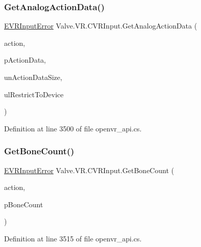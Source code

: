 \mbox{\label{class_valve_1_1_v_r_1_1_c_v_r_input_a67e83bd0fced9bfd2d9a75743d65e64f}} 
\subsubsection{\texorpdfstring{GetAnalogActionData()}{GetAnalogActionData()}}
{\footnotesize\ttfamily \mbox{\hyperlink{namespace_valve_1_1_v_r_a592d7f4189b8346d6c96dbdbaa35bc1b}{E\+V\+R\+Input\+Error}} Valve.\+V\+R.\+C\+V\+R\+Input.\+Get\+Analog\+Action\+Data (\begin{DoxyParamCaption}\item[{ulong}]{action,  }\item[{ref \mbox{\hyperlink{struct_valve_1_1_v_r_1_1_input_analog_action_data__t}{Input\+Analog\+Action\+Data\+\_\+t}}}]{p\+Action\+Data,  }\item[{uint}]{un\+Action\+Data\+Size,  }\item[{ulong}]{ul\+Restrict\+To\+Device }\end{DoxyParamCaption})}



Definition at line 3500 of file openvr\+\_\+api.\+cs.

\mbox{\label{class_valve_1_1_v_r_1_1_c_v_r_input_a900b3c10d417e7833d5013f877a32e7a}} 
\subsubsection{\texorpdfstring{GetBoneCount()}{GetBoneCount()}}
{\footnotesize\ttfamily \mbox{\hyperlink{namespace_valve_1_1_v_r_a592d7f4189b8346d6c96dbdbaa35bc1b}{E\+V\+R\+Input\+Error}} Valve.\+V\+R.\+C\+V\+R\+Input.\+Get\+Bone\+Count (\begin{DoxyParamCaption}\item[{ulong}]{action,  }\item[{ref uint}]{p\+Bone\+Count }\end{DoxyParamCaption})}



Definition at line 3515 of file openvr\+\_\+api.\+cs.

